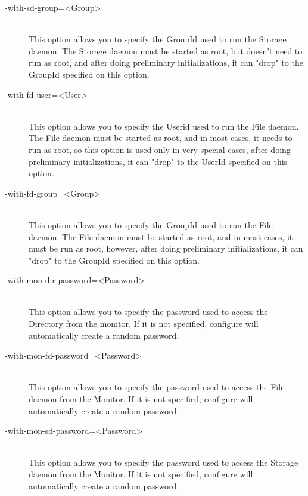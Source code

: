 \begin{description}
\item [ {-}{\-}with-sd-group={\textless}Group{\textgreater}] \hfill \\
This option allows you to specify the GroupId used to  run the Storage daemon.
The Storage daemon must be started as root, but  doesn't need to run as root,
and  after doing preliminary initializations, it can "drop"  to the GroupId
specified on this option.

\item [ {-}{\-}with-fd-user={\textless}User{\textgreater}] \hfill \\
This option allows you to specify the Userid used to  run the File daemon. The
File daemon must be started as root,  and in most cases, it needs to run as
root, so this option is  used only in very special cases,  after doing
preliminary initializations, it can "drop"  to the UserId specified on this
option.

\item [ {-}{\-}with-fd-group={\textless}Group{\textgreater}] \hfill \\
This option allows you to specify the GroupId used to  run the File daemon.
The File daemon must be started as root, and  in most cases, it must be run as
root, however,  after doing preliminary initializations, it can "drop"  to
the GroupId specified on this option.

\item [ {-}{\-}with-mon-dir-password={\textless}Password{\textgreater}] \hfill \\
This option allows you to specify the password used to  access the Directory
from the monitor.  If it is not specified, configure will
automatically create a random  password.

\item [ {-}{\-}with-mon-fd-password={\textless}Password{\textgreater}] \hfill \\
This option allows you to specify the password used to  access the File daemon
from the Monitor.  If it is not specified, configure will
automatically create a random  password.

\item [ {-}{\-}with-mon-sd-password={\textless}Password{\textgreater}] \hfill \\
This option allows you to specify the password used to  access the
Storage daemon from the Monitor. If it is not specified, configure will
automatically create a random  password.


\end{description}
